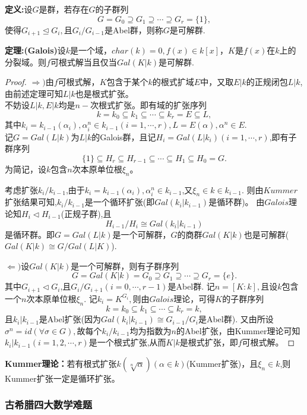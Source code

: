 \documentclass[UTF8]{article}
\begin{document}
\textbf{定义:}设$G$是群，若存在$G$的子群列
$$
G=G_{0}\supseteq G_{1}\supseteq \cdots\supseteq G_{r}=\{1\},
$$
使得$G_{i+1}\trianglelefteq G_{i},$且$G_{i}/G_{i-1}$是Abel群，则称$G$是可解群.


\textbf{定理:(Galois)}设$k$是一个域，$char(k)=0,f(x)\in k[x]$，$K$是$f(x)$在$k$上的分裂域。则$f$可根式解当且仅当$Gal(K|k)$是可解群.\\
\begin{proof}
	$\Rightarrow)$由$f$可根式解，$K$包含于某个$k$的根式扩域$E$中，又取$E|k$的正规闭包$L|k$,由前述定理可知$L|k$也是根式扩张。\\
	不妨设$L|k,E|k$均是$n-$次根式扩张。即有域的扩张序列
	$$
	k=k_{0}\subseteq k_{1}\subseteq \cdots\subseteq k_{r}=E\subseteq L,
	$$
	其中$k_{i}=k_{i-1}(\alpha_{i}),\alpha_{i}^{n}\in k_{i-1}(i=1,\cdots,r),L=E(\alpha),\alpha^{n}\in E.$\\
	记$G=Gal(L|k)$为$L|k$的Galois群，且记$H_{i}=Gal(L|k_{i})(i=1,\cdots,r)$,即有子群序列
	$$
	\{1\}\subseteq H_{r}\subseteq H_{r-1}\subseteq \cdots\subseteq H_{1}\subseteq H_{0}=G.
	$$
	为简记，设$k$包含$n$次本原单位根$\xi_{n}$。
	
	
	考虑扩张$k_{i}/k_{i-1}$,由于$k_{i}=k_{i-1}(\alpha_{i}),\alpha_{i}^{n}\in k_{i-1}$,又$\xi_{n}\in k\in k_{i-1}$.
	则由$Kummer$扩张结果可知,$k_{i}/k_{i-1}$是一个循环扩张(即$Gal(k_{i}|k_{i-1})$是循环群)。
	由$Galois$理论知$H_{i}\triangleleft H_{i-1}$(正规子群),且
	$$H_{i-1}/H_{i}\cong Gal(k_{i}|k_{i-1})$$
	是循环群。即$G=Gal(L|k)$是一个可解群，$G$的商群$Gal(K|k)$也是可解群($Gal(K|k)\cong G/Gal(L|K)$).
	
	
	$\Leftarrow)$设$Gal(K|k)$是一个可解群，则有子群序列
	$$
	G=Gal(K|k)=G_{0}\supseteq G_{1}\supseteq \cdots\supseteq G_{r}=\{e\}.
	$$
	其中$G_{i+1}\triangleleft G_{i}$,且$G_{i}/G_{i+1}(i=0,\cdots,r-1)$是Abel群.
	记$n=[K:k],$且设$k$包含一个$n$次本原单位根$\xi_{n}.$
	记$k_{i}=K^{G_{i}},$则由$Galois$理论，可得$K$的子群序列
	$$
	k=k_{0}\subseteq k_{1}\subseteq \cdots\subseteq k_{r}=k,
	$$
	且$k_{i}|k_{i-1}$是Abel扩张(因为$Gal(k_{i}|k_{i-1})\cong G_{i-1}/G_{i}$是Abel群).
	又由所设$\sigma^{n}=id(\forall \sigma \in G),$故每个$k_{i}/k_{i-1}$均为指数为$n$的Abel扩张，由Kummer理论可知$k_{i}|k_{i-1}(i=1,2,\cdots,r)$是一个根式扩张,从而$K|k$是根式扩张，即$f$可根式解。
\end{proof}


\textbf{Kummer理论：}若有根式扩张$k(\sqrt[n]{\alpha})(\alpha\in k)$(Kummer扩张)，且$\xi_{n}\in k$,则Kummer扩张一定是循环扩张。

\subsubsection{古希腊四大数学难题}
\end{document}
